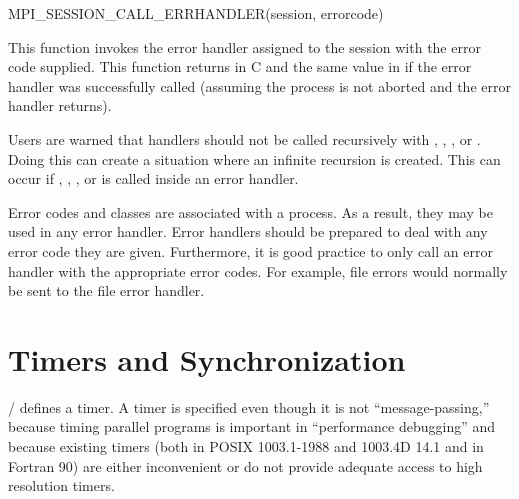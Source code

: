 \begin{funcdef}{MPI\_SESSION\_CALL\_ERRHANDLER}{(\mbox{session}, \mbox{errorcode})}
\end{funcdef}

This function invokes the error handler assigned to the session
with the error code supplied.
This function returns  in C and the same
value in  if the error handler was successfully called
(assuming the process is not aborted and the error handler returns).

\begin{users}
\begin{sloppy}
Users are warned that handlers should not be called recursively with
,
,
, or
.  Doing
this can create a situation where an infinite recursion is created.
This can occur if ,
,
, or
 is called
inside an error handler.

\end{sloppy}

Error codes and classes are associated with a process.  As a result,
they may be used in any error handler.  Error handlers should be
prepared to deal with any error code 
they are 
given.  Furthermore, it is
good practice to only call an error handler with the appropriate
error codes.  For example, file errors would normally be sent to the
file error 
handler.
\end{users}
 

\section{Timers and Synchronization}
\label{sec:timers}
\MPI/ defines a timer.  A timer is specified even though it is not
``message-passing,'' because timing parallel programs is important in
``performance debugging'' and because existing timers (both in POSIX
1003.1-1988 and 1003.4D 14.1 and in Fortran 90) are either inconvenient or do
not provide adequate access to high resolution timers.

